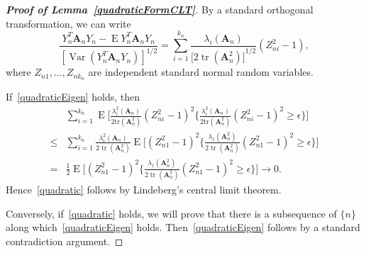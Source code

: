 \documentclass[review]{elsarticle}
\DeclareMathOperator{\mytr}{tr}
\DeclareMathOperator{\myE}{E}
\DeclareMathOperator{\myVar}{Var}
\newcommand{\BA}{\mathbf{A}}    \newcommand{\BB}{\mathbf{B}}    \newcommand{\BC}{\mathbf{C}}    \newcommand{\BD}{\mathbf{D}}    \newcommand{\BE}{\mathbf{E}}    \newcommand{\BF}{\mathbf{F}}    \newcommand{\BG}{\mathbf{G}}    \newcommand{\BH}{\mathbf{H}}    \newcommand{\BI}{\mathbf{I}}    \newcommand{\BJ}{\mathbf{J}}    \newcommand{\BK}{\mathbf{K}}    \newcommand{\BL}{\mathbf{L}}
\theoremstyle{plain}
\theoremstyle{definition}
\theoremstyle{remark}
\begin{document}
\begin{proof}[\textbf{Proof of Lemma~\ref{quadraticFormCLT}}]
    By a standard orthogonal transformation, we can write
    \begin{equation}
        \frac{Y_n^T \BA_n Y_n-\myE Y_n^T \BA_n Y_n}{{[\myVar(Y_n^T \BA_n Y_n)]}^{1/2}}=\sum_{i=1}^{k_n}\frac{\lambda_i(\BA_n)}{{\big[2\mytr(\BA_n^2)\big]}^{1/2}}(Z_{ni}^2-1),
    \end{equation}
    where $Z_{n1},\ldots,Z_{n k_n}$ are independent standard normal random variables.

    If~\ref{quadraticEigen} holds, then
    \begin{equation*}
        \begin{aligned}
            &\sum_{i=1}^{k_n}\myE\Big[\frac{\lambda_i^2(\BA_n)}{2\mathrm{tr}(\BA_n^2)}{(Z_{ni}^2-1)}^2\Big\{\frac{\lambda_i^2(\BA_n)}{2\mathrm{tr}(\BA_n^2)}{(Z_{ni}^2-1)}^2\geq \epsilon\Big\}\Big]\\
            \leq&\sum_{i=1}^{k_n}
            \frac{\lambda_i^2(\BA_n)}{2\mytr(\BA_n^2)}
            \myE\Big[{(Z_{n1}^2-1)}^2\Big\{\frac{\lambda_{1}(\BA_n^2)}{2\mytr(\BA_n^2)}{(Z_{n1}^2-1)}^2\geq \epsilon\Big\}\Big]\\
            =&
            \frac{1}{2}\myE\Big[{(Z_{n1}^2-1)}^2\Big\{\frac{\lambda_{1}(\BA_n^2)}{2\mytr(\BA_n^2)}{(Z_{n1}^2-1)}^2\geq \epsilon\Big\}\Big]\to 0.
        \end{aligned}
    \end{equation*}
    Hence~\ref{quadratic} follows by Lindeberg's central limit theorem.

    Conversely, if~\ref{quadratic} holds, we will prove that there is a subsequence of $\{n\}$ along which~\ref{quadraticEigen} holds. Then~\ref{quadraticEigen} follows by a standard contradiction argument. 


\end{proof}
\end{document}
